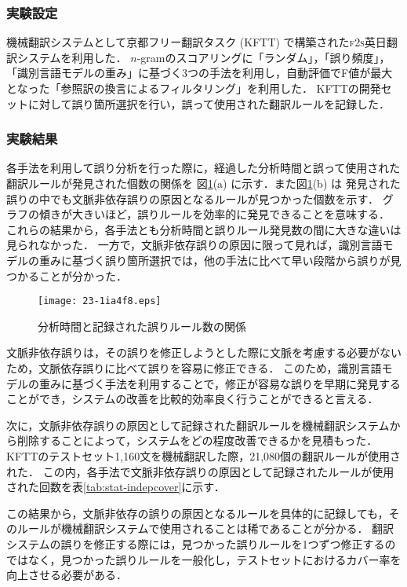\documentclass[japanese]{jnlp_1.4}
\begin{document}
\subsubsection{実験設定}

機械翻訳システムとして京都フリー翻訳タスク (KFTT) で構築された\textsc{f2s}英日翻訳システムを利用した．
$n$-gramのスコアリングに「ランダム」，「誤り頻度」，「識別言語モデルの重み」に基づく3つの手法を利用し，自動評価でF値が最大となった「参照訳の換言によるフィルタリング」を利用した．
KFTTの開発セットに対して誤り箇所選択を行い，誤って使用された翻訳ルールを記録した．


\subsubsection{実験結果}

各手法を利用して誤り分析を行った際に，経過した分析時間と誤って使用された翻訳ルールが発見された個数の関係を
    図\ref{fig:time-found}(a) に示す．また図\ref{fig:time-found}(b) は
発見された誤りの中でも文脈非依存誤りの原因となるルールが見つかった個数を示す．
グラフの傾きが大きいほど，誤りルールを効率的に発見できることを意味する．
これらの結果から，各手法とも分析時間と誤りルール発見数の間に大きな違いは見られなかった．
一方で，文脈非依存誤りの原因に限って見れば，識別言語モデルの重みに基づく誤り箇所選択では，他の手法に比べて早い段階から誤りが見つかることが分かった．

\begin{figure}[b]
\begin{center}
\texttt{[image: 23-1ia4f8.eps]}
\end{center}
\caption{分析時間と記録された誤りルール数の関係}
\label{fig:time-found}
\end{figure}

文脈非依存誤りは，その誤りを修正しようとした際に文脈を考慮する必要がないため，文脈依存誤りに比べて誤りを容易に修正できる．
このため，識別言語モデルの重みに基づく手法を利用することで，修正が容易な誤りを早期に発見することができ，システムの改善を比較的効率良く行うことができると言える．

次に，文脈非依存誤りの原因として記録された翻訳ルールを機械翻訳システムから削除することによって，システムをどの程度改善できるかを見積もった．
KFTTのテストセット1,160文を機械翻訳した際，21,080個の翻訳ルールが使用された．
この内，各手法で文脈非依存誤りの原因として記録されたルールが使用された回数を表\ref{tab:stat-indepcover}に示す．

この結果から，文脈非依存の誤りの原因となるルールを具体的に記録しても，そのルールが機械翻訳システムで使用されることは稀であることが分かる．
翻訳システムの誤りを修正する際には，見つかった誤りルールを1つずつ修正するのではなく，見つかった誤りルールを一般化し，テストセットにおけるカバー率を向上させる必要がある．
\end{document}
